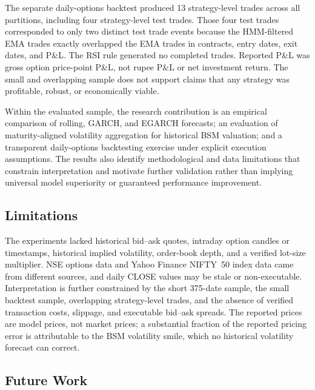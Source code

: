 \documentclass[journal]{IEEEtran}
\begin{document}
The separate daily-options backtest produced 13 strategy-level trades across all partitions, including four strategy-level test trades. Those four test trades corresponded to only two distinct test trade events because the HMM-filtered EMA trades exactly overlapped the EMA trades in contracts, entry dates, exit dates, and P\&L. The RSI rule generated no completed trades. Reported P\&L was gross option price-point P\&L, not rupee P\&L or net investment return. The small and overlapping sample does not support claims that any strategy was profitable, robust, or economically viable.

Within the evaluated sample, the research contribution is an empirical comparison of rolling, GARCH, and EGARCH forecasts; an evaluation of maturity-aligned volatility aggregation for historical BSM valuation; and a transparent daily-options backtesting exercise under explicit execution assumptions. The results also identify methodological and data limitations that constrain interpretation and motivate further validation rather than implying universal model superiority or guaranteed performance improvement.

\subsection*{Limitations}

The experiments lacked historical bid--ask quotes, intraday option candles or timestamps, historical implied volatility, order-book depth, and a verified lot-size multiplier. NSE options data and Yahoo Finance NIFTY~50 index data came from different sources, and daily CLOSE values may be stale or non-executable. Interpretation is further constrained by the short 375-date sample, the small backtest sample, overlapping strategy-level trades, and the absence of verified transaction costs, slippage, and executable bid--ask spreads. The reported prices are model prices, not market prices; a substantial fraction of the reported pricing error is attributable to the BSM volatility smile, which no historical volatility forecast can correct.

\subsection*{Future Work}
\end{document}
